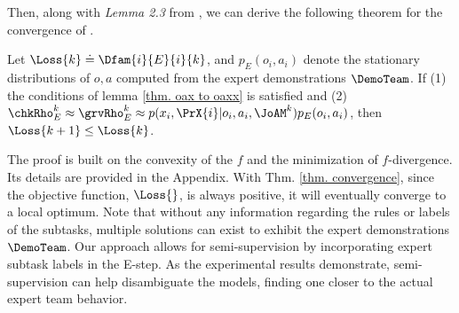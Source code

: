 Then, along with \textit{Lemma 2.3} from \cite{seo2024idil}, we can derive the following theorem for the convergence of \ouralg.
\begin{theorem} 
\label{thm. convergence}
Let $\Loss{k}\doteq\Dfam{i}{E}{i}{k}$, and $p_E(o_i, a_i)$ denote the stationary distributions of $o, a$ computed from the expert demonstrations $\DemoTeam$. If (1) the conditions of lemma \ref{thm. oax to oaxx} is satisfied and (2) $\chkRho_E^k\approx\grvRho_E^k\approx p(x_i, \PrX{i}|o_i, a_i, \JoAM^k) p_E(o_i, a_i)$, then $\Loss{k+1}\leq \Loss{k}$.
\end{theorem}
The proof is built on the convexity of the $f$ and the minimization of $f$-divergence. Its details are provided in the Appendix. With Thm. \ref{thm. convergence}, since the objective function, $\Loss{}$, is always positive, it will eventually converge to a local optimum. Note that without any information regarding the rules or labels of the subtasks, multiple solutions can exist to exhibit the expert demonstrations $\DemoTeam$. Our approach allows for semi-supervision by incorporating expert subtask labels in the E-step. As the experimental results demonstrate, semi-supervision can help disambiguate the models, finding one closer to the actual expert team behavior.


